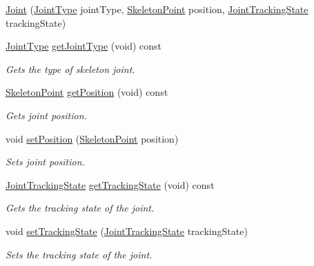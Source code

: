 \begin{DoxyCompactItemize}
\item 
\hyperlink{class_joint_ae0793733fc56fabd5533664215bc8607}{\-Joint} (\hyperlink{joint_type_8h_af92f943e3dc4a7d1fb537fa481094fa9}{\-Joint\-Type} joint\-Type, \hyperlink{class_skeleton_point}{\-Skeleton\-Point} position, \hyperlink{joint_tracking_state_8h_abfe3c456ba94f1b5d35e1c917922b552}{\-Joint\-Tracking\-State} tracking\-State)
\item 
\hyperlink{joint_type_8h_af92f943e3dc4a7d1fb537fa481094fa9}{\-Joint\-Type} \hyperlink{class_joint_a50c1543fd1e71b107d67ff5b497cc48c}{get\-Joint\-Type} (void) const 
\begin{DoxyCompactList}\small\item\em \-Gets the type of skeleton joint. \end{DoxyCompactList}\item 
\hyperlink{class_skeleton_point}{\-Skeleton\-Point} \hyperlink{class_joint_a9ca40e94a43fda3fb9c7a0623b789345}{get\-Position} (void) const 
\begin{DoxyCompactList}\small\item\em \-Gets joint position. \end{DoxyCompactList}\item 
void \hyperlink{class_joint_ab464ea1079b7eba07907e332a5bcde62}{set\-Position} (\hyperlink{class_skeleton_point}{\-Skeleton\-Point} position)
\begin{DoxyCompactList}\small\item\em \-Sets joint position. \end{DoxyCompactList}\item 
\hyperlink{joint_tracking_state_8h_abfe3c456ba94f1b5d35e1c917922b552}{\-Joint\-Tracking\-State} \hyperlink{class_joint_af9e658cc181a7bf38d9afeaa11517511}{get\-Tracking\-State} (void) const 
\begin{DoxyCompactList}\small\item\em \-Gets the tracking state of the joint. \end{DoxyCompactList}\item 
void \hyperlink{class_joint_ac34ce38400bd43aa9a045073d3d50cd8}{set\-Tracking\-State} (\hyperlink{joint_tracking_state_8h_abfe3c456ba94f1b5d35e1c917922b552}{\-Joint\-Tracking\-State} tracking\-State)
\begin{DoxyCompactList}\small\item\em \-Sets the tracking state of the joint. \end{DoxyCompactList}\end{DoxyCompactItemize}


